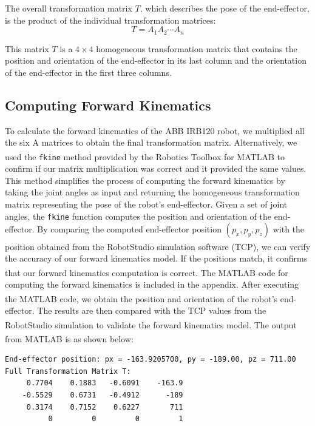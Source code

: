\noindent The overall transformation matrix \( T \), which describes the pose of the end-effector, is the product of the individual transformation matrices:
\noindent
\[
  T = A_1 A_2 \cdots A_n
\]

\noindent This matrix \( T \) is a \( 4 \times 4 \) homogeneous transformation matrix that contains the position and orientation of the end-effector in its last column and the orientation of the end-effector in the first three columns.


\subsection{Computing Forward Kinematics}
To calculate the forward kinematics of the ABB IRB120 robot, we multiplied all the six A matrices to obtain the final transformation matrix. Alternatively, we used the \texttt{fkine} \cite{RoboticsToolbox} method provided by the Robotics Toolbox for MATLAB\textsuperscript{\textregistered} to confirm if our matrix multiplication was correct and it provided the same values. This method simplifies the process of computing the forward kinematics by taking the joint angles as input and returning the homogeneous transformation matrix representing the pose of the robot's end-effector. Given a set of joint angles, the \texttt{fkine} function computes the position and orientation of the end-effector. By comparing the computed end-effector position \((p_x, p_y, p_z)\) with the position obtained from the RobotStudio\textsuperscript{\textregistered} simulation software (TCP), we can verify the accuracy of our forward kinematics model. If the positions match, it confirms that our forward kinematics computation is correct. The MATLAB\textsuperscript{\textregistered} code for computing the forward kinematics is included in the appendix. After executing the MATLAB\textsuperscript{\textregistered} code, we obtain the position and orientation of the robot's end-effector. The results are then compared with the TCP values from the RobotStudio\textsuperscript{\textregistered} simulation to validate the forward kinematics model. The output from MATLAB\textsuperscript{\textregistered} is as shown below:

\begin{verbatim}
End-effector position: px = -163.9205700, py = -189.00, pz = 711.00
Full Transformation Matrix T:
     0.7704    0.1883   -0.6091    -163.9
    -0.5529    0.6731   -0.4912      -189
     0.3174    0.7152    0.6227       711
          0         0         0         1
\end{verbatim}


